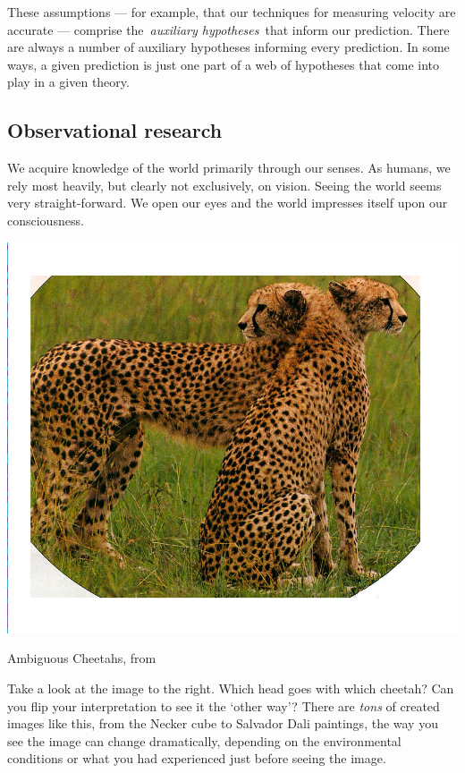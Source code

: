 \begin{refsection}
These assumptions --- for example, that our techniques for measuring velocity are accurate --- comprise the \emph{auxiliary hypotheses} that inform our prediction. There are always a number of auxiliary hypotheses informing every prediction. In some ways, a given prediction is just one part of a web of hypotheses that come into play in a given theory.

\subsection{Observational research}
\label{observationalresearch}

We acquire knowledge of the world primarily through our senses. As humans, we rely most heavily, but clearly not exclusively, on vision. Seeing the world seems very straight-forward. We open our eyes and the world impresses itself upon our consciousness.
\begin{marginfigure}
 \begin{center}


     \includegraphics[scale=0.50]{../images/AmbigCheeta.jpg}
\end{center}
 \caption{Ambiguous Cheetahs, from  ~\citep{Pitts:2007km}}
\label{fig: ambiguouscheetahs}
\end{marginfigure}

Take a look at the image to the right. Which head goes with which cheetah? Can you flip your interpretation to see it the `other way'? There are \emph{tons} of created images like this, from the Necker cube to Salvador Dali paintings, the way you see the image can change dramatically, depending on the environmental conditions or what you had experienced just before seeing the image.


\end{refsection}
